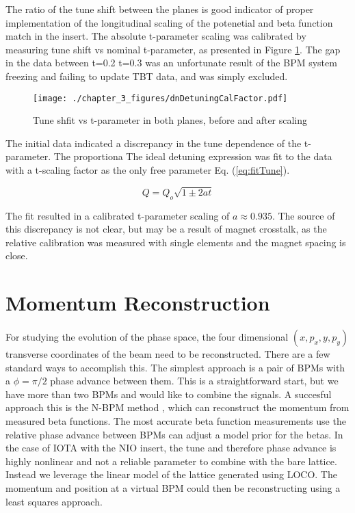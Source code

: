 The ratio of the tune shift between the planes is good indicator of proper implementation of the longitudinal scaling of the potenetial and beta function match in the insert. The absolute t-parameter scaling was calibrated by measuring tune shift vs nominal t-parameter, as presented in Figure \ref{fig:dnTuneVsT}. The gap in the data between t=0.2 t=0.3 was an unfortunate result of the BPM system freezing and failing to update TBT data, and was simply excluded.

\begin{figure}
    \centering
    \texttt{[image: ./chapter\_3\_figures/dnDetuningCalFactor.pdf]}
    \caption{Tune shfit vs t-parameter in both planes, before and after scaling}
    \label{fig:dnTuneVsT}
\end{figure}

The initial data indicated a discrepancy in the tune dependence of the t-parameter. The proportiona The ideal detuning expression was fit to the data with a t-scaling factor as the only free parameter Eq. (\ref{eq:fitTune}). 

\begin{equation}
    Q = Q_o \sqrt{1\pm 2at}
    \label{eq:fitTune}
\end{equation}

The fit resulted in a calibrated t-parameter scaling of $a \approx 0.935$. The source of this discrepancy is not clear, but may be a result of magnet crosstalk, as the relative calibration was measured with single elements and the magnet spacing is close.

\section{Momentum Reconstruction} \label{sec:momReconst}
For studying the evolution of the phase space, the four dimensional $(x,p_x,y,p_y)$ transverse coordinates of the beam need to be reconstructed. There are a few standard ways to accomplish this. The simplest approach is a pair of BPMs with a $\phi = \pi/2$ phase advance between them. This is a straightforward start, but we have more than two BPMs and would like to combine the signals. A succesful approach this is the N-BPM method \cite{langerOptics}, which can reconstruct the momentum from measured beta functions. The most accurate beta function measurements use the relative phase advance between BPMs can adjust a model prior for the betas. In the case of IOTA with the NIO insert, the tune and therefore phase advance is highly nonlinear and not a reliable parameter to combine with the bare lattice. Instead we leverage the linear model of the lattice generated using LOCO. The momentum and position at a virtual BPM could then be reconstructing using a least squares approach. 

